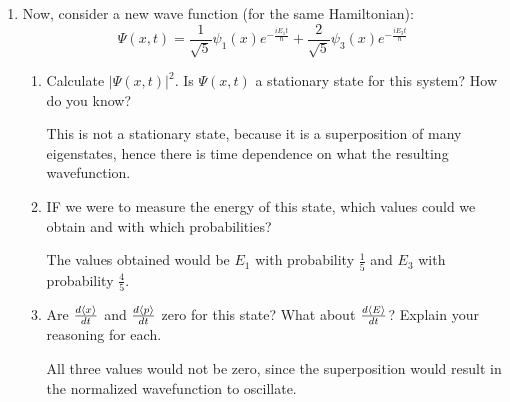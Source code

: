 \documentclass[10pt,letterpaper]{article}
\begin{document}
\begin{enumerate}
\begin{enumerate}
\begin{enumerate}[i)]
\color{violet}
It is a stationary state, because the state $\psi_{3}$ does not vary as time evolves. 
\color{black}

\item If we were to measure the energy of this state, which values could we obtain and with which probabilities?

\color{violet}
The energy measured would be $E_{3}$ with 100\% probability. 
\color{black}

\item Are $\frac{d\braket{x}}{dt}$ and $\frac{d\braket{p}}{dt}$ zero for this state? What about $\frac{d\braket{E}}{dt}$? Explain your reasoning for each.

\color{violet}
Both $\frac{d\braket{x}}{dt}$ and $\frac{d\braket{p}}{dt}$ are zero because the wavefunction is only tied to position. $\frac{d\braket{E}}{dt}$ would not be, since it is tied to the time evolution of the state. 
\color{black}

\end{enumerate}

\item Now, consider a new wave function (for the same Hamiltonian):
$$\Psi(x, t) = \frac{1}{\sqrt{5}}\psi_{1}(x)e^{-\frac{iE_{1}t}{\hbar}} + \frac{2}{\sqrt{5}}\psi_{3}(x)e^{-\frac{iE_{3}t}{\hbar}}$$

\begin{enumerate}

\item Calculate $|\Psi(x, t)|^{2}$. Is $\Psi(x, t)$ a stationary state for this system? How do you know?

\color{violet}
This is not a stationary state, because it is a superposition of many eigenstates, hence there is time dependence on what the resulting wavefunction. 
\color{black}

\item IF we were to measure the energy of this state, which values could we obtain and with which probabilities?

\color{violet}
The values obtained would be $E_{1}$ with probability $\frac{1}{5}$ and $E_{3}$ with probability $\frac{4}{5}$. 
\color{black}

\item Are $\frac{d\braket{x}}{dt}$ and $\frac{d\braket{p}}{dt}$ zero for this state? What about $\frac{d\braket{E}}{dt}$? Explain your reasoning for each.

All three values would not be zero, since the superposition would result in the normalized wavefunction to oscillate. 


\end{enumerate}
\end{enumerate}
\end{enumerate}
\end{document}
